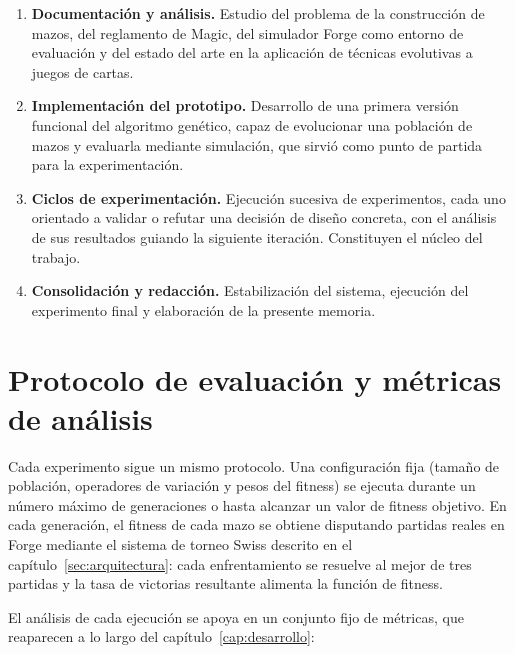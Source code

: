 \begin{enumerate}
    \item \textbf{Documentación y análisis.} Estudio del problema de la construcción de mazos, del reglamento de Magic, del simulador Forge como entorno de evaluación y del estado del arte en la aplicación de técnicas evolutivas a juegos de cartas.
    \item \textbf{Implementación del prototipo.} Desarrollo de una primera versión funcional del algoritmo genético, capaz de evolucionar una población de mazos y evaluarla mediante simulación, que sirvió como punto de partida para la experimentación.
    \item \textbf{Ciclos de experimentación.} Ejecución sucesiva de experimentos, cada uno orientado a validar o refutar una decisión de diseño concreta, con el análisis de sus resultados guiando la siguiente iteración. Constituyen el núcleo del trabajo.
    \item \textbf{Consolidación y redacción.} Estabilización del sistema, ejecución del experimento final y elaboración de la presente memoria.
\end{enumerate}

\section{Protocolo de evaluación y métricas de análisis}

Cada experimento sigue un mismo protocolo. Una configuración fija (tamaño de población, operadores de variación y pesos del fitness) se ejecuta durante un número máximo de generaciones o hasta alcanzar un valor de fitness objetivo. En cada generación, el fitness de cada mazo se obtiene disputando partidas reales en Forge mediante el sistema de torneo Swiss descrito en el capítulo~\ref{sec:arquitectura}: cada enfrentamiento se resuelve al mejor de tres partidas y la tasa de victorias resultante alimenta la función de fitness.

El análisis de cada ejecución se apoya en un conjunto fijo de métricas, que reaparecen a lo largo del capítulo~\ref{cap:desarrollo}:

